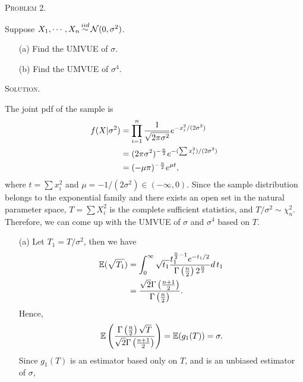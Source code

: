 \documentclass{article}
\begin{document}
\begin{CJK}{UTF8}{gbsn}
    \begin{shaded}
        \noindent\textsc{Problem 2.}\par
        Suppose $X_1, \cdots, X_n \mathop{\sim}\limits^{iid}{\mathcal N} (0, \sigma^2)$.
        \begin{itemize}
            \item [(a)] Find the UMVUE of $\sigma$.
            \item [(b)] Find the UMVUE of $\sigma^4$.
        \end{itemize}
    \end{shaded}
    \noindent\textsc{Solution.}\par
    The joint pdf of the sample is
    \begin{align}
        f(X|\sigma^2) & = \prod_{i=1}^n \frac{1}{\sqrt{2\pi \sigma^2}} e^{- x_i^2/(2\sigma^2)} \notag \\
                      & = (2\pi \sigma^2)^{-\frac{n}{2}} e^{-(\sum x_i^2)/(2\sigma^2)} \notag         \\
                      & = (-\mu \pi)^{-\frac{n}{2}} e^{\mu t}, \notag
    \end{align}
    where $t=\sum x_i^2$ and $\mu = -1/(2\sigma^2)\in (-\infty, 0)$. Since the sample distribution belongs to the
    exponential family and there exists an open set in the natural parameter space, $T=\sum X_i^2$ is the complete
    sufficient statistics, and $T/\sigma^2\sim \chi^2_{n}$.
    Therefore, we can come up with the UMVUE of $\sigma$ and $\sigma^4$ based on $T$.
    \begin{itemize}
        \item [(a)] Let $T_1 = T/\sigma^2$, then we have
              \begin{align}
                  {\mathbb E}(\sqrt{T_1}) & = \int_0^{\infty} \sqrt{t_1} \frac{t_1^{\frac{n}{2} - 1}e^{-t_1/2}}{\Gamma \left (\frac{n}{2}\right )2^{\frac{n}{2}}} d \,t_1 \notag \\
                                  & = \frac{\sqrt{2}\Gamma\left (\frac{n+1}{2} \right )}{\Gamma\left (\frac{n}{2} \right )}.\notag
              \end{align}
              Hence,
              \begin{align}
                  {\mathbb E} \left (\frac{\Gamma\left (\frac{n}{2} \right ) \sqrt{T} }{\sqrt{2} \Gamma\left (\frac{n+1}{2} \right )} \right ) = {\mathbb E}(g_1(T)) =  \sigma.\notag
              \end{align}
              Since $g_1(T)$ is an estimator based only on $T$, and is an unbiased estimator of $\sigma$,

\end{itemize}
\end{CJK}
\end{document}
